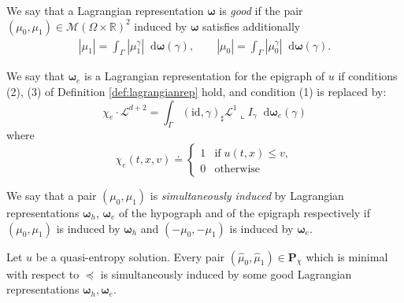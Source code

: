 \documentclass[10pt,a4paper]{amsart}
\newcommand*\dif{\mathop{}\!\mathrm{d}}
\newcommand{\bs}[1]{\boldsymbol{#1}}
\begin{document}
\begin{defi}\label{defi:goodlr}
We say that a Lagrangian representation $\bs \omega$ is \emph{good} if the pair $(\mu_0, \mu_1) \in \mathscr M(\Omega \times \mathbb R)^2$ induced by $\bs \omega$ satisfies additionally
\begin{equation}\label{eq:optcond}
    \begin{aligned}
        \left| \mu_1 \right| = \int_{\Gamma} |\mu_1^{\gamma}| \dif \bs \omega(\gamma), \qquad \left| \mu_0 \right| = \int_{\Gamma} |\mu_0^{\gamma}| \dif \bs \omega(\gamma).
    \end{aligned}
\end{equation}
\end{defi}

\begin{defi}\label{defi:lagraepi}
We say that $\bs \omega_e$ is a Lagrangian representation for the epigraph of $u$ if conditions (2), (3) of Definition \ref{def:lagrangianrep} hold, and condition (1) is replaced by:
\begin{equation}\label{eq:deflagromegae}
        \chi_e \cdot \mathscr L^{d+2} = \int_{\Gamma} (\mathrm{id}, \gamma)_{\sharp} \mathscr L^1 \llcorner I_{\gamma} \dif \bs \omega_e(\gamma)
    \end{equation}
where 
\begin{equation}
    \chi_e(t,x,v) \doteq \begin{cases}
        1 & \text{if} \; u(t, x) \leq v , \\
        0 & \text{otherwise}
    \end{cases}
\end{equation}
\end{defi}

\begin{defi}\label{defi:siminduc}
    We say that a pair $(\mu_0, \mu_1)$ is \textit{simultaneously induced} by Lagrangian representations $\bs \omega_h$, $\bs \omega_e$ of the hypograph and of the epigraph respectively if $(\mu_0, \mu_1)$ is induced by $\bs \omega_h$ and $(-\mu_0, -\mu_1)$ is induced by $\bs \omega_e$.
\end{defi}

\begin{prop}\label{prop:goodpairs}
    Let $u$ be a quasi-entropy solution. Every pair $(\widehat \mu_0, \widehat \mu_1) \in \mathbf P_\chi$  which is minimal with respect to $\preceq$ is simultaneously induced by some good Lagrangian representations $\bs \omega_h, \bs \omega_e$.
\end{prop}
\end{document}
